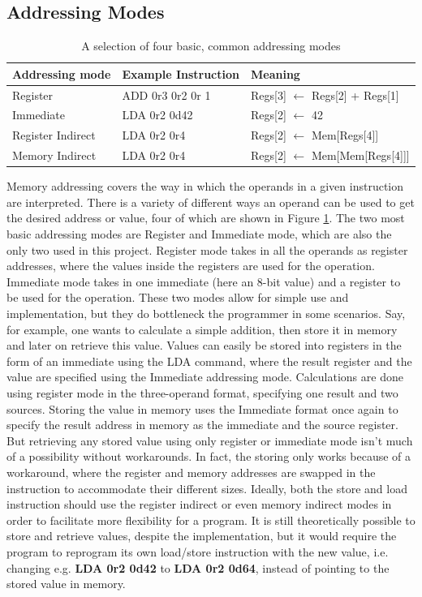 \subsection{Addressing Modes}
\begin{table}[bp!]
    \caption[Addressing modes]{A selection of four basic, common addressing modes}
    \label{tab::AddressingModes}
    \begin{center}
        \begin{tabular}{lll}
            Addressing mode & Example Instruction & Meaning \\ \hline
            Register & ADD 0r3 0r2 0r 1 & Regs[3] $\leftarrow$ Regs[2] + Regs[1]\\ \hline
            Immediate & LDA 0r2 0d42 & Regs[2] $\leftarrow$ 42\\ \hline
            Register Indirect & LDA 0r2 0r4 & Regs[2] $\leftarrow$ Mem[Regs[4]] \\ \hline
            Memory Indirect & LDA 0r2 0r4 & Regs[2] $\leftarrow$ Mem[Mem[Regs[4]]]\\ \hline
        \end{tabular}
    \end{center}
\end{table}
Memory addressing covers the way in which the operands in a given instruction are interpreted. There is a variety of different ways an operand can be used to get the desired address or value, four of which are shown in Figure \ref{tab::AddressingModes}. The two most basic addressing modes are Register and Immediate mode, which are also the only two used in this project. Register mode takes in all the operands as register addresses, where the values inside the registers are used for the operation. Immediate mode takes in one immediate (here an 8-bit value) and a register to be used for the operation. These two modes allow for simple use and implementation, but they do bottleneck the programmer in some scenarios. Say, for example, one wants to calculate a simple addition, then store it in memory and later on retrieve this value. Values can easily be stored into registers in the form of an immediate using the LDA command, where the result register and the value are specified using the Immediate addressing mode. Calculations are done using register mode in the three-operand format, specifying one result and two sources. Storing the value in memory uses the Immediate format once again to specify the result address in memory as the immediate and the source register. But retrieving any stored value using only register or immediate mode isn't much of a possibility without workarounds. In fact, the storing only works because of a workaround, where the register and memory addresses are swapped in the instruction to accommodate their different sizes. Ideally, both the store and load instruction should use the register indirect or even memory indirect modes in order to facilitate more flexibility for a program. It is still theoretically possible to store and retrieve values, despite the implementation, but it would require the program to reprogram its own load/store instruction with the new value, i.e. changing e.g. \textbf{LDA 0r2 0d42} to \textbf{LDA 0r2 0d64}, instead of pointing to the stored value in memory.

